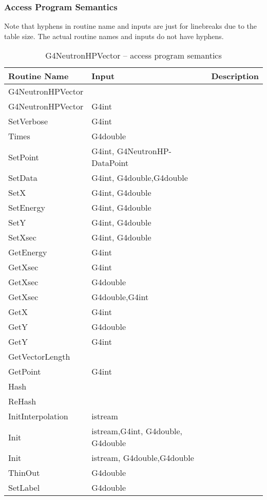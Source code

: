 \documentclass[12pt]{article}
\begin{document}
\subsubsection{Access Program Semantics}%
Note that hyphens in routine name and inputs are just for linebreaks due to the table size. The actual routine names and inputs do not have hyphens.
\begin{longtable}{p{}p{}p{}}
\caption{G4NeutronHPVector -- access program semantics}\label{Table_NeutronHPVectorSemantics}\\
\toprule
\bf Routine Name & \bf Input & \bf Description \\\midrule
\arrayrulecolor{lightgray}
G4NeutronHPVector & & \\\hline
G4NeutronHPVector & G4int & \\\hline
SetVerbose & G4int & \\\hline
Times & G4double & \\\hline
SetPoint & G4int, G4NeutronHP-DataPoint & \\\hline
SetData & G4int, G4double,G4double & \\\hline
SetX & G4int, G4double & \\\hline
SetEnergy & G4int, G4double & \\\hline
SetY & G4int, G4double & \\\hline
SetXsec & G4int, G4double & \\\hline
GetEnergy & G4int & \\\hline
GetXsec & G4int & \\\hline
GetXsec & G4double & \\\hline
GetXsec & G4double,G4int & \\\hline
GetX & G4int & \\\hline
GetY & G4double & \\\hline
GetY & G4int & \\\hline
GetVectorLength & & \\\hline
GetPoint & G4int & \\\hline
Hash & & \\\hline
ReHash & & \\\hline
InitInterpolation & istream & \\\hline
Init & istream,G4int, G4double, G4double & \\\hline
Init & istream, G4double,G4double & \\\hline
ThinOut & G4double & \\\hline
SetLabel & G4double & \\\hline

\end{longtable}
\end{document}
